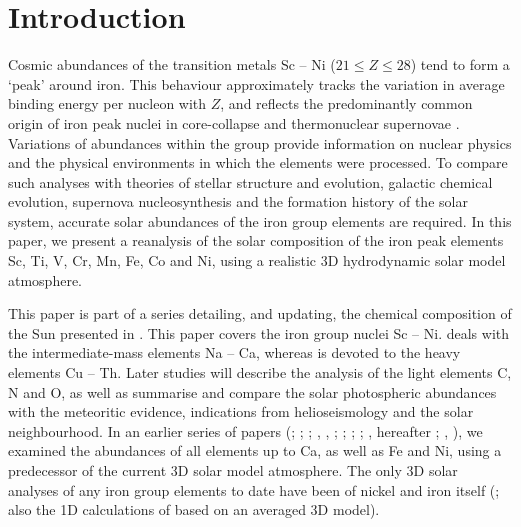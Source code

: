\documentclass[traditabstract]{aa}
\begin{document}
\maketitle
%


\section{Introduction}
\label{intro}
Cosmic abundances of the transition metals Sc -- Ni ($21\le Z\le 28$) tend to form a `peak' around iron.
This behaviour approximately tracks the variation in average binding energy per nucleon with $Z$, and reflects the
predominantly common origin of iron peak nuclei in core-collapse and thermonuclear supernovae \citep[e.g.][]{Pagel97}.  Variations of abundances within the group
provide information on nuclear physics and the physical environments in which the elements were processed.  To compare such analyses with theories
of stellar structure and evolution, galactic chemical evolution, supernova nucleosynthesis and the formation history
of the solar system, accurate solar abundances of the iron group elements are required.  In this paper, we present a
reanalysis of the solar composition of the iron peak elements Sc, Ti, V, Cr, Mn, Fe, Co and Ni, using a realistic 3D hydrodynamic
solar model atmosphere.

This paper is part of a series detailing, and updating, the chemical composition of the Sun presented in \citet[][hereafter ]{AGSS}.  This paper covers the iron group nuclei Sc -- Ni.   \citet[][hereafter ]{AGSS_NaCa} deals with the intermediate-mass elements Na -- Ca, whereas \citet[hereafter ]{AGSS_heavy} is devoted to the heavy elements Cu -- Th. Later studies will describe the analysis of the light elements C, N and O, as well as summarise and compare the solar photospheric abundances with the meteoritic evidence, indications from helioseismology and the solar neighbourhood. In an earlier series of papers (\citealt{AspI}; \citealt{AspII}; \citealt{AspIII}; \citealt{2001ApJ...556L..63A}, \citealt{2002ApJ...573L.137A}, \citealt{AspIV}; \citealt{AspV}; \citealt{AspVI}; \citealt{ScottVII}; \citealt{AGS05}, hereafter ; \citealt{2008A&A...490..817M}, \citealt{Scott09Ni}), we examined the abundances of all elements up to Ca, as well as Fe and Ni, using a predecessor of the current 3D solar model atmosphere.  The only 3D solar analyses of any iron group elements to date have been of nickel \citep{Scott09Ni} and iron itself (\citealt{1994A&A...291..635A, AspI, AspII, Caffau11}; also the 1D calculations of \citealt{MB_fe} based on an averaged 3D model).
\end{document}
